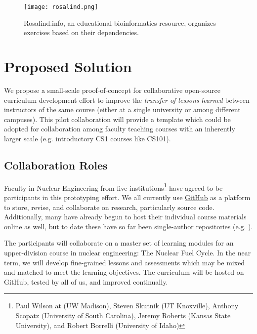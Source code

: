 \documentclass[11pt]{article}
\begin{document}
\begin{figure}[ht!]
        \begin{center}
                \texttt{[image: rosalind.png]}
        \end{center}
        \caption{Rosalind.info, an educational bioinformatics resource, 
        organizes exercises based on their dependencies.}
        \label{fig:rosalind}
\end{figure}

          \section{Proposed Solution}
          We propose a small-scale proof-of-concept for collaborative
          open-source curriculum development effort to improve the \emph{transfer of lessons 
          learned} between instructors of the same course (either at a single 
          university or among different campuses). This pilot collaboration 
          will provide a template which could be adopted for collaboration 
          among faculty teaching courses with an inherently larger scale (e.g. 
          introductory CS1 courses like CS101).

          \subsection{Collaboration Roles}
          Faculty in Nuclear Engineering from five institutions\footnote{
          Paul Wilson at (UW Madison), 
          Steven Skutnik (UT Knoxville), 
          Anthony Scopatz (University of South Carolina), 
          Jeremy Roberts (Kansas State University), 
          and Robert Borrelli (University of Idaho)
          } have agreed to be participants in 
          this prototyping effort. We all currently use 
          \href{https://github.com}{GitHub} as a platform to store, 
          revise, and collaborate on research, particularly source code. 
          Additionally, many have already begun to host their individual course 
          materials online as well, but to date these have so far been single-author 
          repositories (e.g. \cite{huff_npre412_2017}).

          The participants will collaborate on a master set of learning 
          modules for an upper-division course in nuclear engineering: 
          The Nuclear Fuel Cycle. In the near term, we will develop 
          fine-grained lessons and assessments which may be mixed and matched 
          to meet the learning objectives. The curriculum will be hosted on 
          GitHub, tested by all of us, and improved continually.
          
\end{document}
